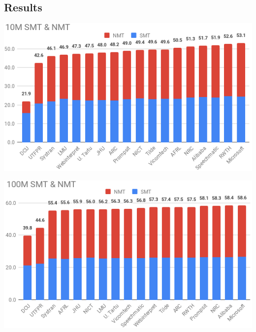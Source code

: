 \documentclass[a0]{sciposter}
\begin{document}
\begin{multicols*}{2}
\section*{\Large Results}

\includegraphics[width=\columnwidth]{assets/10M_crop.png}

\includegraphics[width=\columnwidth]{assets/100M_crop.png}



\end{multicols*}
\end{document}
